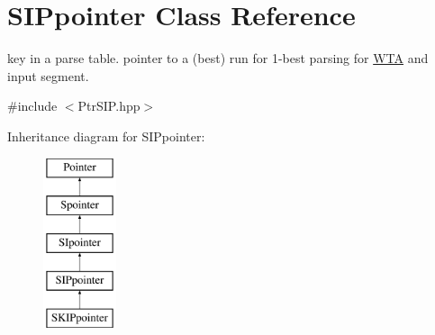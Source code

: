 \hypertarget{classSIPpointer}{}\section{S\+I\+Ppointer Class Reference}
\label{classSIPpointer}


key in a parse table. pointer to a (best) run for 1-\/best parsing for \mbox{\hyperlink{classWTA}{W\+TA}} and input segment.  




{\ttfamily \#include $<$Ptr\+S\+I\+P.\+hpp$>$}

Inheritance diagram for S\+I\+Ppointer\+:\begin{figure}[H]
\begin{center}
\leavevmode
\includegraphics[height=5.000000cm]{classSIPpointer}
\end{center}
\end{figure}
